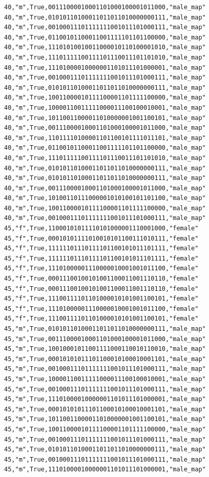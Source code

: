\documentclass[authoryearcitations]{UoYCSproject}
\begin{document}
\begin{framed}
\begin{verbatim}
40,"m",True,00111000010001101000100001011000,"male_map"
40,"m",True,01010110100011011011010000000111,"male_map"
40,"m",True,00100011101111111001011101000111,"male_map"
40,"m",True,01100101100011001111101101100000,"male_map"
40,"m",True,11101010010011000010110100001010,"male_map"
40,"m",True,11101111100111101110011101101010,"male_map"
40,"m",True,11101000010000001101011101000001,"male_map"
40,"m",True,00100011101111111001011101000111,"male_map"
40,"m",True,01010110100011011011010000000111,"male_map"
40,"m",True,10011000010111100001101111100000,"male_map"
40,"m",True,10000110011111000011100100010001,"male_map"
40,"m",True,10110011000011010000001001100101,"male_map"
40,"m",True,00111000010001101000100001011000,"male_map"
40,"m",True,11011110100001101100101111011101,"male_map"
40,"m",True,01100101100011001111101101100000,"male_map"
40,"m",True,11101111100111101110011101101010,"male_map"
40,"m",True,01010110100011011011010000000111,"male_map"
40,"m",True,01010110100011011011010000000111,"male_map"
40,"m",True,00111000010001101000100001011000,"male_map"
40,"m",True,10100110111000001010100101101100,"male_map"
40,"m",True,10011000010111100001101111100000,"male_map"
40,"m",True,00100011101111111001011101000111,"male_map"
45,"f",True,11000101011110101000001110001000,"female"
45,"f",True,00010101111010010101100111010111,"female"
45,"f",True,11111101110111101100101011101111,"female"
45,"f",True,11111101110111101100101011101111,"female"
45,"f",True,11101000001110000010001001011100,"female"
45,"f",True,00011100100101001100011001110110,"female"
45,"f",True,00011100100101001100011001110110,"female"
45,"f",True,11100111101101000010101001100101,"female"
45,"f",True,11101000001110000010001001011100,"female"
45,"f",True,11100111101101000010101001100101,"female"
45,"m",True,01010110100011011011010000000111,"male_map"
45,"m",True,00111000010001101000100001011000,"male_map"
45,"m",True,10010001011001111000110010110010,"male_map"
45,"m",True,00010101011101100010100010001101,"male_map"
45,"m",True,00100011101111111001011101000111,"male_map"
45,"m",True,10000110011111000011100100010001,"male_map"
45,"m",True,00100011101111111001011101000111,"male_map"
45,"m",True,11101000010000001101011101000001,"male_map"
45,"m",True,00010101011101100010100010001101,"male_map"
45,"m",True,10110011000011010000001001100101,"male_map"
45,"m",True,10011000010111100001101111100000,"male_map"
45,"m",True,00100011101111111001011101000111,"male_map"
45,"m",True,01010110100011011011010000000111,"male_map"
45,"m",True,00100011101111111001011101000111,"male_map"
45,"m",True,11101000010000001101011101000001,"male_map"

\end{verbatim}
\end{framed}
\end{document}
